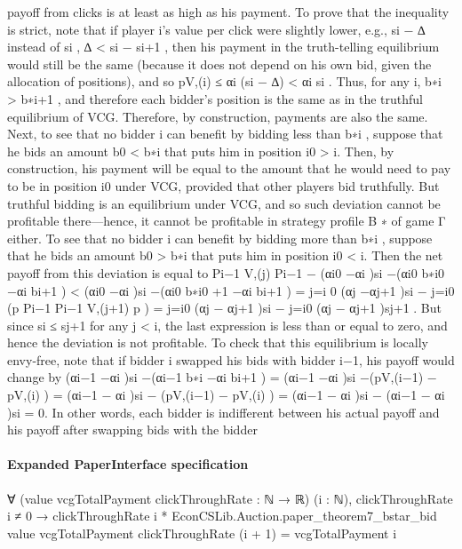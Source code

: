 \documentclass[10pt]{article}
\begin{document}
\begin{ReviewVerbatim}
payoff from clicks is at least as high as his payment. To prove that the inequality is strict, note
that if player i’s value per click were slightly lower, e.g., si − ∆ instead of si , ∆ < si − si+1 , then
his payment in the truth-telling equilibrium would still be the same (because it does not depend on
his own bid, given the allocation of positions), and so pV,(i) ≤ αi (si − ∆) < αi si . Thus, for any i,
b∗i > b∗i+1 , and therefore each bidder’s position is the same as in the truthful equilibrium of VCG.
Therefore, by construction, payments are also the same.
Next, to see that no bidder i can benefit by bidding less than b∗i , suppose that he bids an amount
b0 < b∗i that puts him in position i0 > i. Then, by construction, his payment will be equal to the
amount that he would need to pay to be in position i0 under VCG, provided that other players bid
truthfully. But truthful bidding is an equilibrium under VCG, and so such deviation cannot be
profitable there—hence, it cannot be profitable in strategy profile B ∗ of game Γ either.
To see that no bidder i can benefit by bidding more than b∗i , suppose that he bids an amount
b0 > b∗i that puts him in position i0 < i. Then the net payoff from this deviation is equal to
Pi−1 V,(j)
Pi−1
−
(αi0 −αi )si −(αi0 b∗i0 −αi bi+1 ) < (αi0 −αi )si −(αi0 b∗i0 +1 −αi bi+1 ) = j=i
0 (αj −αj+1 )si −
j=i0 (p
Pi−1
Pi−1
V,(j+1)
p
) = j=i0 (αj − αj+1 )si − j=i0 (αj − αj+1 )sj+1 . But since si ≤ sj+1 for any j < i, the last
expression is less than or equal to zero, and hence the deviation is not profitable.
To check that this equilibrium is locally envy-free, note that if bidder i swapped his bids with
bidder i−1, his payoff would change by (αi−1 −αi )si −(αi−1 b∗i −αi bi+1 ) = (αi−1 −αi )si −(pV,(i−1) −
pV,(i) ) = (αi−1 − αi )si − (pV,(i−1) − pV,(i) ) = (αi−1 − αi )si − (αi−1 − αi )si = 0. In other words, each
bidder is indifferent between his actual payoff and his payoff after swapping bids with the bidder
\end{ReviewVerbatim}


\paragraph{Expanded PaperInterface specification}
\begin{ReviewVerbatim}
∀ (value vcgTotalPayment clickThroughRate : ℕ → ℝ) (i : ℕ),
  clickThroughRate i ≠ 0 →
    clickThroughRate i * EconCSLib.Auction.paper_theorem7_bstar_bid value vcgTotalPayment clickThroughRate (i + 1) =
      vcgTotalPayment i
\end{ReviewVerbatim}
\end{document}

